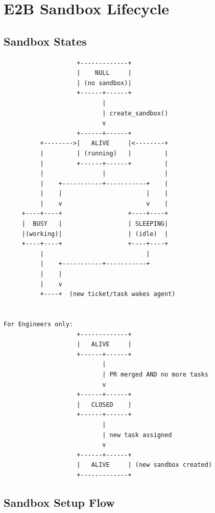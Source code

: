 \documentclass[11pt,a4paper]{article}
\begin{document}
\section{E2B Sandbox Lifecycle}

\subsection{Sandbox States}

\begin{verbatim}
                    +-------------+
                    |    NULL     |
                    | (no sandbox)|
                    +------+------+
                           |
                           | create_sandbox()
                           v
                    +------+------+
          +-------->|   ALIVE     |<--------+
          |         | (running)   |         |
          |         +------+------+         |
          |                |                |
          |    +-----------+-----------+    |
          |    |                       |    |
          |    v                       v    |
     +----+----+                  +----+----+
     |  BUSY   |                  | SLEEPING|
     |(working)|                  | (idle)  |
     +----+----+                  +----+----+
          |                            |
          |    +-----------+-----------+
          |    |
          |    v
          +----+  (new ticket/task wakes agent)


For Engineers only:
                    +-------------+
                    |   ALIVE     |
                    +------+------+
                           |
                           | PR merged AND no more tasks
                           v
                    +------+------+
                    |   CLOSED    |
                    +------+------+
                           |
                           | new task assigned
                           v
                    +------+------+
                    |   ALIVE     | (new sandbox created)
                    +-------------+
\end{verbatim}

\subsection{Sandbox Setup Flow}
\end{document}
